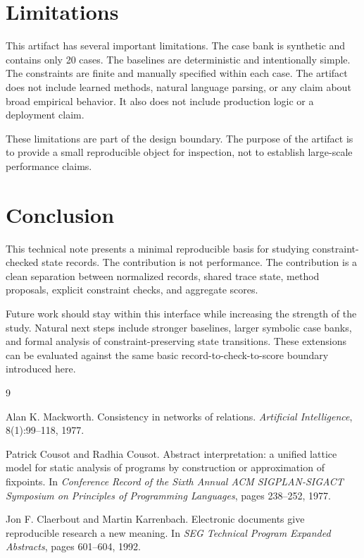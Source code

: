 \documentclass[11pt]{article}
\begin{document}
\section{Limitations}

This artifact has several important limitations. The case bank is synthetic and
contains only 20 cases. The baselines are deterministic and intentionally
simple. The constraints are finite and manually specified within each case. The
artifact does not include learned methods, natural language parsing, or any
claim about broad empirical behavior. It also does not include production
logic or a deployment claim.

These limitations are part of the design boundary. The purpose of the artifact
is to provide a small reproducible object for inspection, not to establish
large-scale performance claims.

\section{Conclusion}

This technical note presents a minimal reproducible basis for studying
constraint-checked state records. The contribution is not performance. The
contribution is a clean separation between normalized records, shared trace
state, method proposals, explicit constraint checks, and aggregate scores.

Future work should stay within this interface while increasing the strength of
the study. Natural next steps include stronger baselines, larger symbolic case
banks, and formal analysis of constraint-preserving state transitions. These
extensions can be evaluated against the same basic record-to-check-to-score
boundary introduced here.

\begin{thebibliography}{9}

Alan K. Mackworth.
\newblock Consistency in networks of relations.
\newblock \emph{Artificial Intelligence}, 8(1):99--118, 1977.

Patrick Cousot and Radhia Cousot.
\newblock Abstract interpretation: a unified lattice model for static analysis
of programs by construction or approximation of fixpoints.
\newblock In \emph{Conference Record of the Sixth Annual ACM SIGPLAN-SIGACT
Symposium on Principles of Programming Languages}, pages 238--252, 1977.

Jon F. Claerbout and Martin Karrenbach.
\newblock Electronic documents give reproducible research a new meaning.
\newblock In \emph{SEG Technical Program Expanded Abstracts}, pages 601--604,
1992.

\end{thebibliography}
\end{document}
